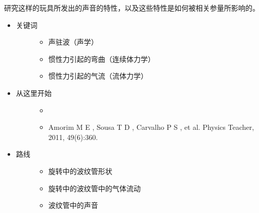 \documentclass[a4paper,10pt,english]{sphinxmanual}
\begin{document}
研究这样的玩具所发出的声音的特性，以及这些特性是如何被相关参量所影响的。
\begin{itemize}
\item {} \begin{description}
\item[{关键词}] \leavevmode\begin{itemize}
\item {} 
声驻波（声学）

\item {} 
惯性力引起的弯曲（连续体力学）

\item {} 
惯性力引起的气流（流体力学）

\end{itemize}

\end{description}

\item {} \begin{description}
\item[{从这里开始}] \leavevmode\begin{itemize}
\item {} 

\item {} 
Amorim M E , Sousa T D , Carvalho P S , et al.  Physics Teacher, 2011, 49(6):360.

\end{itemize}

\end{description}

\item {} \begin{description}
\item[{路线}] \leavevmode\begin{itemize}
\item {} 
旋转中的波纹管形状

\item {} 
旋转中的波纹管中的气体流动

\item {} 
波纹管中的声音

\end{itemize}

\end{description}

\end{itemize}
\end{document}
